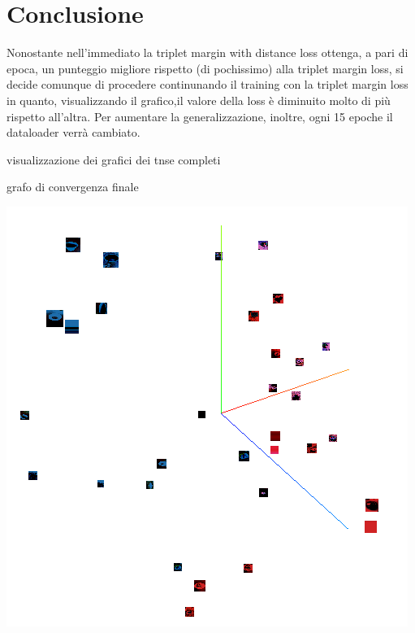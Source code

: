 \documentclass[11pt]{article}
\begin{document}
\pagebreak
\section{Conclusione}

Nonostante nell'immediato la triplet margin with distance loss ottenga, a pari di epoca, un punteggio migliore rispetto (di pochissimo)
alla triplet margin loss,
si decide comunque di procedere continunando il training con la triplet margin loss in quanto, visualizzando il grafico,il valore della loss
è diminuito molto di più rispetto all'altra.
Per aumentare la generalizzazione, inoltre, ogni 15 epoche il dataloader verrà cambiato. 

\begin{center}
    visualizzazione dei grafici dei tnse completi
\end{center}

\begin{center}
    grafo di convergenza finale
\end{center}

\begin{center}
    \begin{minipage}{0.48\linewidth}
    \includegraphics[width=\linewidth]{tensorboard_2.png}
    \end{minipage}
\end{center}
\end{document}
